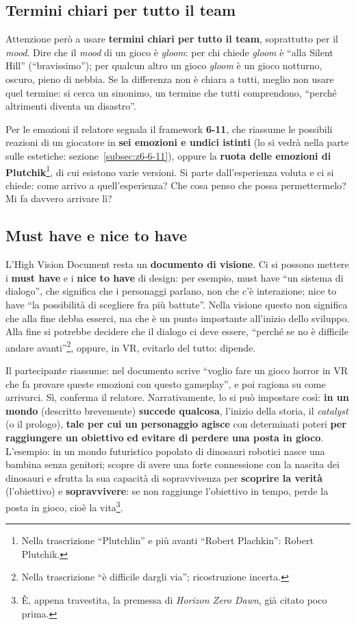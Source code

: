 \subsection{Termini chiari per tutto il team}

Attenzione però a usare \textbf{termini chiari per tutto il team}, soprattutto
per il \emph{mood}. Dire che il \emph{mood} di un gioco è \emph{gloom}: per chi chiede
\emph{gloom} è ``alla Silent Hill'' (``bravissimo''); per qualcun altro un gioco
\emph{gloom} è un gioco notturno, oscuro, pieno di nebbia. Se la differenza non
è chiara a tutti, meglio non usare quel termine: si cerca un sinonimo, un termine
che tutti comprendono, ``perché altrimenti diventa un disastro''.

Per le emozioni il relatore segnala il framework \textbf{6-11}, che riassume le
possibili reazioni di un giocatore in \textbf{sei emozioni e undici istinti} (lo
si vedrà nella parte sulle estetiche: sezione~\ref{subsec:z6-6-11}), oppure la
\textbf{ruota delle emozioni di Plutchik}\footnote{Nella trascrizione
``Plutchlin'' e più avanti ``Robert Plachkin'': Robert Plutchik.}, di cui
esistono varie versioni. Si parte dall'esperienza voluta e ci si chiede: come
arrivo a quell'esperienza? Che cosa penso che possa permettermelo? Mi fa davvero
arrivare lì?

\subsection{Must have e nice to have}

L'High Vision Document resta un \textbf{documento di visione}. Ci si possono
mettere i \textbf{must have} e i \textbf{nice to have} di design: per esempio,
must have ``un sistema di dialogo'', che significa che i personaggi parlano, non
che c'è interazione; nice to have ``la possibilità di scegliere fra più
battute''. Nella visione questo non significa che alla fine debba esserci, ma
che è un punto importante all'inizio dello sviluppo. Alla fine si potrebbe
decidere che il dialogo ci deve essere, ``perché se no è difficile andare
avanti''\footnote{Nella trascrizione ``è difficile dargli via''; ricostruzione
incerta.}, oppure, in VR, evitarlo del tutto: dipende.

Il partecipante riassume: nel documento scrive ``voglio fare un gioco horror in
VR che fa provare queste emozioni con questo gameplay'', e poi ragiona su come
arrivarci. Sì, conferma il relatore. Narrativamente, lo si può impostare così:
\textbf{in un mondo} (descritto brevemente) \textbf{succede qualcosa}, l'inizio
della storia, il \emph{catalyst} (o il prologo), \textbf{tale per cui un
personaggio agisce} con determinati poteri \textbf{per raggiungere un obiettivo}
\textbf{ed evitare di perdere una posta in gioco}. L'esempio: in un mondo
futuristico popolato di dinosauri robotici nasce una bambina senza genitori;
scopre di avere una forte connessione con la nascita dei dinosauri e sfrutta la
sua capacità di sopravvivenza per \textbf{scoprire la verità} (l'obiettivo) e
\textbf{sopravvivere}: se non raggiunge l'obiettivo in tempo, perde la posta in
gioco, cioè la vita\footnote{È, appena travestita, la premessa di \emph{Horizon
Zero Dawn}, già citato poco prima.}.


